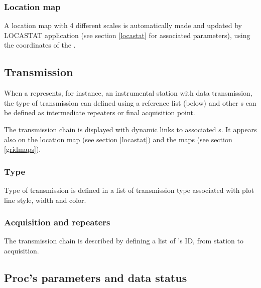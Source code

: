 \subsubsection{Location map}

A location map with 4 different scales is automatically made and updated by LOCASTAT application (see section \ref{locastat} for associated parameters), using the coordinates of the .


\subsection{Transmission}

When a  represents, for instance, an instrumental station with data transmission, the type of transmission can defined using a reference list (below) and other s can be defined as intermediate repeaters or final acquisition point.

The transmission chain is displayed with dynamic links to associated s. It appears also on the location map (see section \ref{locastat}) and the  maps (see section \ref{gridmaps}).

\subsubsection{Type}

Type of transmission is defined in a list of transmission type associated with plot line style, width and color.




\subsubsection{Acquisition and repeaters}

The transmission chain is described by defining a list of 's ID, from station to acquisition.


\subsection{Proc's parameters and data status}

